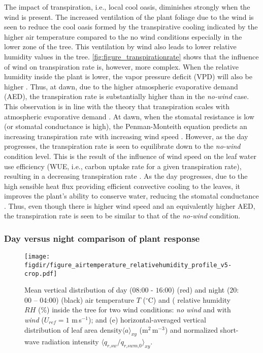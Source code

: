 The impact of transpiration, i.e., local cool oasis, diminishes strongly when the wind is present. The increased ventilation of the plant foliage due to the wind is seen to reduce the cool oasis formed by the transpirative cooling indicated by the higher air temperature compared to the no wind conditions especially in the lower zone of the tree. This ventilation by wind also leads to lower relative humidity values in the tree. \cref{fig:figure_transpirationrate} shows that the influence of wind on transpiration rate is, however, more complex. When the relative humidity inside the plant is lower, the vapor pressure deficit (VPD) will also be higher \citep{Manickathan2018a}. Thus, at dawn, due to the higher atmospheric evaporative demand (AED), the transpiration rate is substantially higher than in the \textit{no-wind} case. This observation is in line with the theory that transpiration scales with atmospheric evaporative demand \citep{McVicar2012}. At dawn, when the stomatal resistance is low (or stomatal conductance is high), the Penman-Monteith equation predicts an increasing transpiration rate with increasing wind speed \citep{Idso1977,nobel2009physicochemical}. However, as the day progresses, the transpiration rate is seen to equilibrate down to the \textit{no-wind} condition level. This is the result of the influence of wind speed on the leaf water use efficiency (WUE, i.e., carbon uptake rate for a given transpiration rate), resulting in a decreasing transpiration rate \citep{Dixon1983,nobel2009physicochemical,Schymanski2016}. As the day progresses, due to the high sensible heat flux providing efficient convective cooling to the leaves, it improves the plant’s ability to conserve water, reducing the stomatal conductance \citep{Idso1977}. Thus, even though there is higher wind speed and an equivalently higher AED, the transpiration rate is seen to be similar to that of the \textit{no-wind} condition.


\subsubsection*{Day versus night comparison of plant response}


\begin{sidewaysfigure}[p]
	\centering
	\texttt{[image: \\figdir/figure\_airtemperature\_relativehumidity\_profile\_v5-crop.pdf]}
	\caption{Mean vertical distribution of day ($08$:$00$ - $16$:$00$) (red) and night ($20$:$00$ – $04$:$00$)  (black)  air temperature $T$ ($^{\circ}$C) and ( relative humidity $RH$ (\%) inside the tree for two wind conditions:   \textit{no wind} and  with \textit{wind} ($U_{ref}=1$ m\,s$^{-1}$); and (e) horizontal-averaged vertical distribution of leaf area density$\langle a \rangle_{\textit{xy}}$ (m$^2$\,m$^{-3}$) and normalized short-wave radiation intensity  $\langle q_{\textit{r,sw}}/q_{\textit{r,swm,0}} \rangle_{\textit{xy}}$.}
	\label{fig:figure_airtemperature_relativehumidity_profile}
\end{sidewaysfigure}

